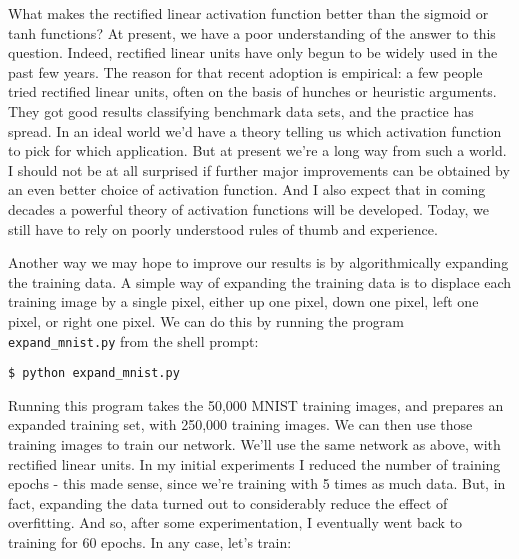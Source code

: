 What makes the rectified linear activation function better than the sigmoid or tanh functions? At present, we have a poor understanding of the answer to this question. Indeed, rectified linear units have only begun to be widely used in the past few years. The reason for that recent adoption is empirical: a few people tried rectified linear units, often on the basis of hunches or heuristic arguments. They got good results classifying benchmark data sets, and the practice has spread. In an ideal world we'd have a theory telling us which activation function to pick for which application. But at present we're a long way from such a world. I should not be at all surprised if further major improvements can be obtained by an even better choice of activation function. And I also expect that in coming decades a powerful theory of activation functions will be developed. Today, we still have to rely on poorly understood rules of thumb and experience.

 Another way we may hope to improve our results is by algorithmically expanding the training data. A simple way of expanding the training data is to displace each training image by a single pixel, either up one pixel, down one pixel, left one pixel, or right one pixel. We can do this by running the program \lstinline{expand_mnist.py} from the shell prompt:
 
\lstinline{$ python expand_mnist.py}

Running this program takes the 50,000 MNIST training images, and prepares an expanded training set, with 250,000 training images. We can then use those training images to train our network. We'll use the same network as above, with rectified linear units. In my initial experiments I reduced the number of training epochs - this made sense, since we're training with 5 times as much data. But, in fact, expanding the data turned out to considerably reduce the effect of overfitting. And so, after some experimentation, I eventually went back to training for 60 epochs. In any case, let's train:


